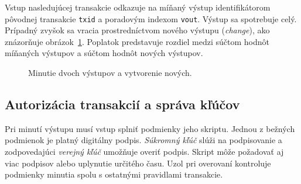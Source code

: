 Vstup nasledujúcej transakcie odkazuje na míňaný výstup
identifikátorom pôvodnej transakcie \texttt{txid} a poradovým
indexom \texttt{vout}. Výstup sa spotrebuje celý. Prípadný zvyšok
sa vracia prostredníctvom nového výstupu (\emph{change}), ako
znázorňuje obrázok~\ref{fig:utxo-example}. Poplatok predstavuje
rozdiel medzi súčtom hodnôt míňaných výstupov a súčtom hodnôt
nových výstupov.

\begin{figure}[htbp]
  \centering
  \caption{Minutie dvoch výstupov a vytvorenie nových.}
  \label{fig:utxo-example}
\end{figure}

\subsection{Autorizácia transakcií a správa kľúčov}

Pri minutí výstupu musí vstup splniť podmienky jeho skriptu.
Jednou z bežných podmienok je platný digitálny podpis.
\emph{Súkromný kľúč} slúži na podpisovanie a zodpovedajúci
\emph{verejný kľúč} umožňuje overiť podpis. Skript môže požadovať
aj viac podpisov alebo uplynutie určitého času. Uzol pri overovaní
kontroluje podmienky minutia spolu s ostatnými pravidlami
transakcie.

